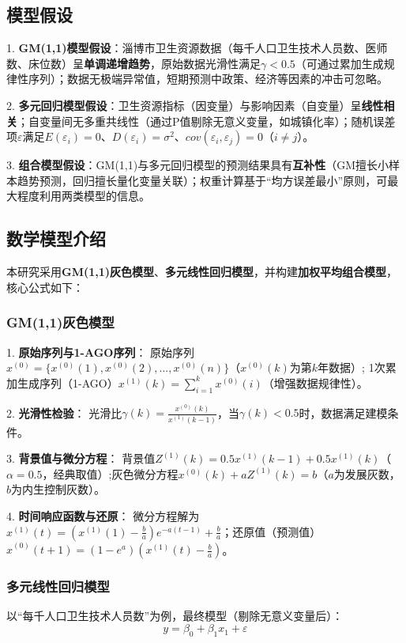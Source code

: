 \documentclass{MathNoteCN}
\begin{document}
\subsection{模型假设}
1. \textbf{GM(1,1)模型假设}：淄博市卫生资源数据（每千人口卫生技术人员数、医师数、床位数）呈\textbf{单调递增趋势}，原始数据光滑性满足$\gamma<0.5$（可通过累加生成规律性序列）；数据无极端异常值，短期预测中政策、经济等因素的冲击可忽略\cite{wang2025}。

2. \textbf{多元回归模型假设}：卫生资源指标（因变量）与影响因素（自变量）呈\textbf{线性相关}；自变量间无多重共线性（通过P值剔除无意义变量，如城镇化率）；随机误差项$\varepsilon$满足$E(\varepsilon_i)=0$、$D(\varepsilon_i)=\sigma^2$、$cov(\varepsilon_i,\varepsilon_j)=0$（$i≠j$）\cite{wang2025}。

3. \textbf{组合模型假设}：GM(1,1)与多元回归模型的预测结果具有\textbf{互补性}（GM擅长小样本趋势预测，回归擅长量化变量关联）；权重计算基于“均方误差最小”原则，可最大程度利用两类模型的信息\cite{wang2025}。


\subsection{数学模型介绍}
本研究采用\textbf{GM(1,1)灰色模型}、\textbf{多元线性回归模型}，并构建\textbf{加权平均组合模型}，核心公式如下：

\subsubsection{GM(1,1)灰色模型}
1. \textbf{原始序列与1-AGO序列}：  
   原始序列$x^{(0)} = \{x^{(0)}(1), x^{(0)}(2), ..., x^{(0)}(n)\}$（$x^{(0)}(k)$为第$k$年数据）; 1次累加生成序列（1-AGO）$x^{(1)}(k) = \sum_{i=1}^k x^{(0)}(i)$（增强数据规律性）\cite{wang2025}。  

2. \textbf{光滑性检验}：  
   光滑比$\gamma(k) = \frac{x^{(0)}(k)}{x^{(1)}(k-1)}$，当$\gamma(k)<0.5$时，数据满足建模条件\cite{wang2025}。  

3. \textbf{背景值与微分方程}：  
   背景值$Z^{(1)}(k) = 0.5x^{(1)}(k-1) + 0.5x^{(1)}(k)$（$\alpha=0.5$，经典取值）;灰色微分方程$x^{(0)}(k) + aZ^{(1)}(k) = b$（$a$为发展灰数，$b$为内生控制灰数）\cite{wang2025}。

4. \textbf{时间响应函数与还原}：  
   微分方程解为$x^{(1)}(t) = \left(x^{(1)}(1) - \frac{b}{a}\right)e^{-a(t-1)} + \frac{b}{a}$；还原值（预测值）$\hat{x}^{(0)}(t+1) = (1-e^a)\left(x^{(1)}(t) - \frac{b}{a}\right)$\cite{wang2025}。

\subsubsection{多元线性回归模型}
以“每千人口卫生技术人员数”为例，最终模型（剔除无意义变量后）：  
\[y = \beta_0 + \beta_1 x_1 + \varepsilon\]  
\end{document}
